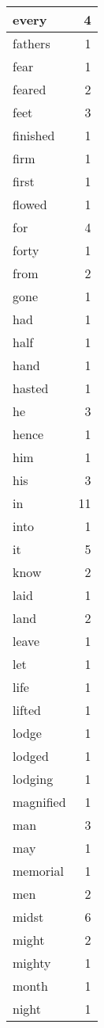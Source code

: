 \begin{center}
\begin{longtable}{l|r}
every & 4\\ \hline 
fathers & 1\\ \hline 
fear & 1\\ \hline 
feared & 2\\ \hline 
feet & 3\\ \hline 
finished & 1\\ \hline 
firm & 1\\ \hline 
first & 1\\ \hline 
flowed & 1\\ \hline 
for & 4\\ \hline 
forty & 1\\ \hline 
from & 2\\ \hline 
gone & 1\\ \hline 
had & 1\\ \hline 
half & 1\\ \hline 
hand & 1\\ \hline 
hasted & 1\\ \hline 
he & 3\\ \hline 
hence & 1\\ \hline 
him & 1\\ \hline 
his & 3\\ \hline 
in & 11\\ \hline 
into & 1\\ \hline 
it & 5\\ \hline 
know & 2\\ \hline 
laid & 1\\ \hline 
land & 2\\ \hline 
leave & 1\\ \hline 
let & 1\\ \hline 
life & 1\\ \hline 
lifted & 1\\ \hline 
lodge & 1\\ \hline 
lodged & 1\\ \hline 
lodging & 1\\ \hline 
magnified & 1\\ \hline 
man & 3\\ \hline 
may & 1\\ \hline 
memorial & 1\\ \hline 
men & 2\\ \hline 
midst & 6\\ \hline 
might & 2\\ \hline 
mighty & 1\\ \hline 
month & 1\\ \hline 
night & 1\\ \hline 

\end{longtable}
\end{center}
